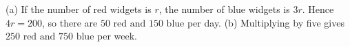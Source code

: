 (a) If the number of red widgets is $r$, the number of blue widgets is $3r$. Hence $4r=200$, so there are $\boxed{50\text{ red and }150\text{ blue}}$ per day. (b) Multiplying by five gives $\boxed{250\text{ red and }750\text{ blue}}$ per week.
